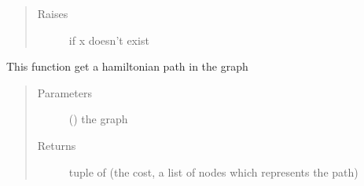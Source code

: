 \documentclass[letterpaper,10pt,english]{sphinxmanual}
\begin{document}
\begin{fulllineitems}
\begin{fulllineitems}
\begin{quote}
\begin{description}
\item[{Raises}] \leavevmode
{} \textendash{} if x doesn’t exist

\end{description}\end{quote}

\end{fulllineitems}


\end{fulllineitems}


\begin{fulllineitems}
\label{\detokenize{Graph:Graph.get_hamiltonian_path}}
This function get a hamiltonian path in the graph
\begin{quote}\begin{description}
\item[{Parameters}] \leavevmode
{} ({\hyperref[\detokenize{Graph:Graph.Graph}]{}}) \textendash{} the graph

\item[{Returns}] \leavevmode
tuple of (the cost, a list of nodes which represents the path)

\end{description}\end{quote}

\end{fulllineitems}

\end{document}

